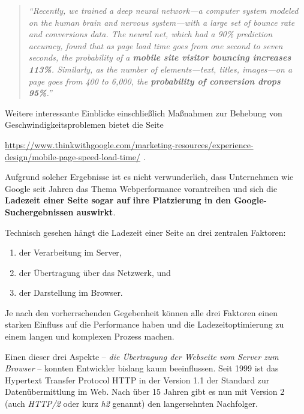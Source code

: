 \documentclass[a4paper, justified, notoc]{tufte-handout} %
\begin{document}
\begin{quote}
	\emph{``Recently, we trained a deep neural network—a computer system modeled on the human brain and nervous system—with a large set of bounce rate and conversions data. The neural net, which had a 90\% prediction accuracy, found that as page load time goes from one second to seven seconds, the probability of a \textbf{mobile site visitor bouncing increases 113\%}. Similarly, as the number of elements—text, titles, images—on a page goes from 400 to 6,000, the \textbf{probability of conversion drops 95\%}.''}
\end{quote}

Weitere interessante Einblicke einschließlich Maßnahmen zur Behebung von Geschwindigkeitsproblemen bietet die Seite

\url{https://www.thinkwithgoogle.com/marketing-resources/experience-design/mobile-page-speed-load-time/} .

Aufgrund solcher Ergebnisse ist es nicht verwunderlich, dass Unternehmen wie Google seit Jahren das Thema Webperformance vorantreiben und sich die \textbf{Ladezeit einer Seite sogar auf ihre Platzierung in den Google-Suchergebnissen auswirkt}.

Technisch gesehen hängt die Ladezeit einer Seite an drei zentralen Faktoren: 
\begin{enumerate}
	\item der Verarbeitung im Server, 
	\item der Übertragung über das Netzwerk, und 
	\item der Darstellung im Browser.
\end{enumerate} 
Je nach den vorherrschenden Gegebenheit können alle drei Faktoren einen starken Einfluss auf die Performance haben und die Ladezeitoptimierung zu einem langen und komplexen Prozess machen.

Einen dieser drei Aspekte -- \emph{die Übertragung der Webseite vom Server zum Browser} -- konnten Entwickler bislang kaum beeinflussen. Seit 1999 ist das Hypertext Transfer Protocol HTTP in der Version 1.1 der Standard zur Datenübermittlung im Web. Nach über 15 Jahren gibt es nun mit Version 2 (auch \emph{HTTP/2} oder kurz \emph{h2} genannt) den langersehnten Nachfolger. 
\end{document}
